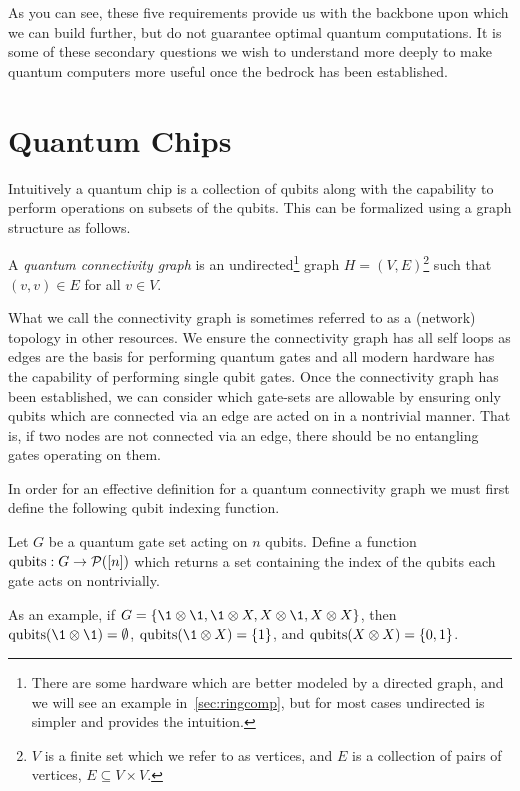 As you can see, these five requirements provide us with the backbone upon which we can build further, but do not guarantee optimal quantum computations.
It is some of these secondary questions we wish to understand more deeply to make quantum computers more useful once the bedrock has been established.

\section{Quantum Chips}

Intuitively a quantum chip is a collection of qubits along with the capability to perform operations on subsets of the qubits.
This can be formalized using a graph structure as follows. %

\begin{definition}\label{def:topology}
    A \emph{quantum connectivity graph} is an undirected\footnote{There are some hardware which are better modeled by a directed graph, and we will see an example in~\cref{sec:ringcomp}, but for most cases undirected is simpler and provides the intuition.} graph $H = (V, E)$\footnote{$V$ is a finite set which we refer to as vertices, and $E$ is a collection of pairs of vertices, \ie{} $E \subseteq V \times V$.} such that $(v, v) \in E$ for all $v \in V$.
\end{definition}
What we call the connectivity graph is sometimes referred to as a (network) topology in other resources.
We ensure the connectivity graph has all self loops as edges are the basis for performing quantum gates and all modern hardware has the capability of performing single qubit gates.
Once the connectivity graph has been established, we can consider which gate-sets are allowable by ensuring only qubits which are connected via an edge are acted on in a nontrivial manner.
That is, if two nodes are not connected via an edge, there should be no entangling gates operating on them. %

In order for an effective definition for a quantum connectivity graph we must first define the following qubit indexing function.
\begin{definition}
    Let $G$ be a quantum gate set acting on $n$ qubits.
    Define a function $\operatorname{qubits}: G \to \mathcal{P}([n])$ which returns a set containing the index of the qubits each gate acts on nontrivially.
\end{definition}
As an example, if $G = \qty{\1 \otimes \1, \1 \otimes X, X \otimes \1, X \otimes X}$, then $\qubits(\1 \otimes \1) = \emptyset$, $\qubits(\1 \otimes X) = \qty{1}$, and $\operatorname{qubits}(X \otimes X) = \qty{0, 1}$.

